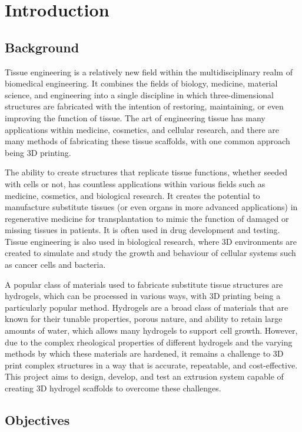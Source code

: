 \chapter{Introduction}

\section{Background}

Tissue engineering is a relatively new field within the multidisciplinary realm of biomedical engineering. It combines the fields of biology, medicine, material science, and engineering into a single discipline in which three-dimensional structures are fabricated with the intention of restoring, maintaining, or even improving the function of tissue. The art of engineering tissue has many applications within medicine, cosmetics, and cellular research, and there are many methods of fabricating these tissue scaffolds, with one common approach being 3D printing.

The ability to create structures that replicate tissue functions, whether seeded with cells or not, has countless applications within various fields such as medicine, cosmetics, and biological research. It creates the potential to manufacture substitute tissues (or even organs in more advanced applications) in regenerative medicine for transplantation to mimic the function of damaged or missing tissues in patients. It is often used in drug development and testing. Tissue engineering is also used in biological research, where 3D environments are created to simulate and study the growth and behaviour of cellular systems such as cancer cells and bacteria.

A popular class of materials used to fabricate substitute tissue structures are hydrogels, which can be processed in various ways, with 3D printing being a particularly popular method. Hydrogels are a broad class of materials that are known for their tunable properties, porous nature, and ability to retain large amounts of water, which allows many hydrogels to support cell growth. However, due to the complex rheological properties of different hydrogels and the varying methods by which these materials are hardened, it remains a challenge to 3D print complex structures in a way that is accurate, repeatable, and cost-effective. This project aims to design, develop, and test an extrusion system capable of creating 3D hydrogel scaffolds to overcome these challenges.

\section{Objectives}

